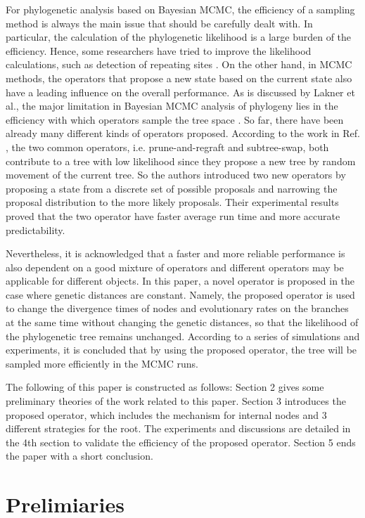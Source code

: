 \documentclass{bmcart}
\begin{document}
For phylogenetic analysis based on Bayesian MCMC, the efficiency of a sampling method is always the main issue that should be carefully dealt with. In particular, the calculation of the phylogenetic likelihood is a large burden of the efficiency. Hence, some researchers have tried to improve the likelihood calculations, such as detection of repeating sites \cite{kobert2017efficient}. On the other hand, in MCMC methods, the operators that propose a new state based on the current state also have a leading influence on the overall performance. As is discussed by Lakner et al., the major limitation in Bayesian MCMC analysis of phylogeny lies in the efficiency with which operators sample the tree space \cite{lakner2008efficiency}. So far, there have been already many different kinds of operators proposed. According to the work in Ref. \cite{hohna2011guided}, the two common operators, i.e. prune-and-regraft and subtree-swap, both contribute to a tree with low likelihood since they propose a new tree by random movement of the current tree. So the authors introduced two new operators by proposing a state from a discrete set of possible proposals and narrowing the proposal distribution to the more likely proposals. Their experimental results proved that the two operator have faster average run time and more accurate predictability. 

Nevertheless, it is acknowledged that a faster and more reliable performance is also dependent on a good mixture of operators and different operators may be applicable for different objects. In this paper, a novel operator is proposed in the case where genetic distances are constant. Namely, the proposed operator is used to change the divergence times of nodes and evolutionary rates on the branches at the same time without changing the genetic distances, so that the likelihood of the phylogenetic tree remains unchanged. According to a series of simulations and experiments, it is concluded that by using the proposed operator, the tree will be sampled more efficiently in the MCMC runs. 

The following of this paper is constructed as follows: Section 2 gives some preliminary theories of the work related to this paper. Section 3 introduces the proposed operator, which includes the mechanism for internal nodes and 3 different strategies for the root. The experiments and discussions are detailed in the 4th section to validate the efficiency of the proposed operator. Section 5 ends the paper with a short conclusion.
\section*{Prelimiaries}
\end{document}
